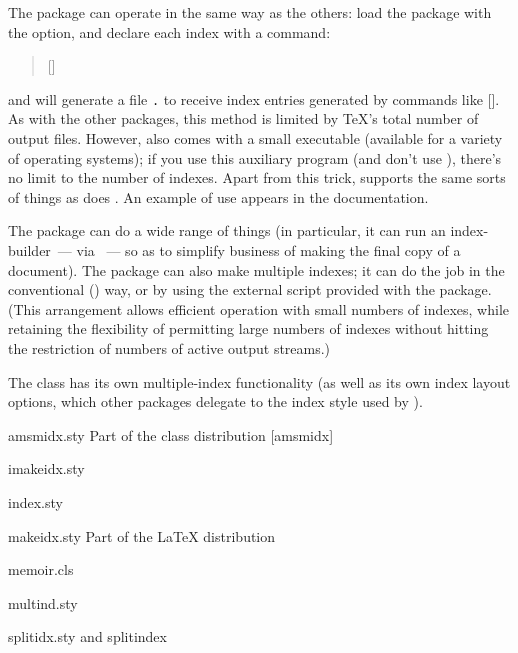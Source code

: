 The  package can operate in the same way as the
others: load the package with the  option, and
declare each index with a  command:
\begin{quote}
  []{}
\end{quote}
and  will generate a file
\texttt{.} to receive index entries
generated by commands like []{}.
As with the other packages, this method is limited by \TeX{}'s total
number of output files.  However,  also comes with
a small executable  (available for a variety of
operating systems); if you use this auxiliary program (and don't use
), there's no limit to the number of indexes.  Apart
from this trick,  supports the same sorts of things
as does .  An example of use appears in
the documentation.

The  package can do a wide range of things (in particular,
it can run an index-builder~--- via %
~--- so as to simplify
business of making the final copy of a document).  The package can
also make multiple indexes; it can do the job in the conventional
() way, or by using the external
 script provided with the 
package.  (This arrangement allows efficient operation with small
numbers of indexes, while retaining the flexibility of permitting
large numbers of indexes without hitting the restriction of numbers of
active output streams.)

The  class has its own multiple-index functionality (as
well as its own index layout options, which other packages delegate to
the index style used by ).
\begin{ctanrefs}
\item[amsmidx.sty]Part of the  class distribution
  [amsmidx]
\item[imakeidx.sty]
\item[index.sty]
\item[makeidx.sty]Part of the \LaTeX{} distribution
\item[memoir.cls]
\item[multind.sty]
\item[splitidx.sty \bgroup\nothtml{\normalfont}and \egroup splitindex]%
\end{ctanrefs}

